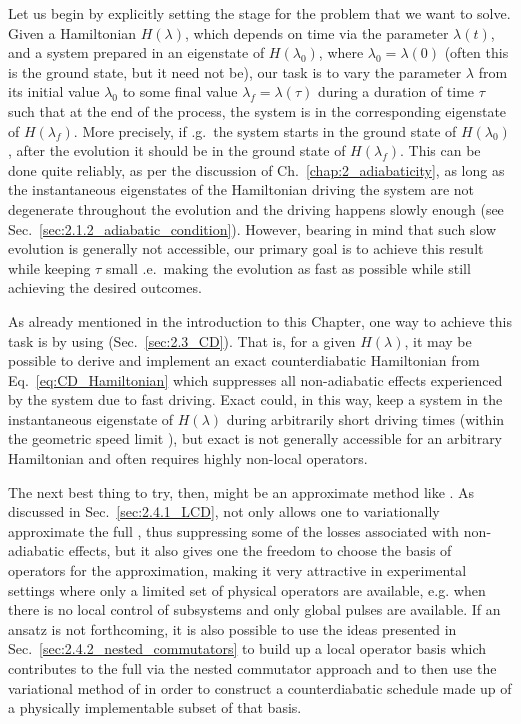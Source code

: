 Let us begin by explicitly setting the stage for the problem that we want to solve. Given a Hamiltonian $H(\lambda)$, which depends on time via the parameter $\lambda(t)$, and a system prepared in an eigenstate of $H(\lambda_0)$, where $\lambda_0 = \lambda(0)$ (often this is the ground state, but it need not be), our task is to vary the parameter $\lambda$ from its initial value $\lambda_0$ to some final value $\lambda_f = \lambda(\tau)$ during a duration of time $\tau$ such that at the end of the process, the system is in the corresponding eigenstate of $H(\lambda_f)$. More precisely, if \@e.g.~the system starts in the ground state of $H(\lambda_0)$, after the evolution it should be in the ground state of $H(\lambda_f)$. This can be done quite reliably, as per the discussion of Ch.~\ref{chap:2_adiabaticity}, as long as the instantaneous eigenstates of the Hamiltonian driving the system are not degenerate throughout the evolution and the driving happens slowly enough (see Sec.~\ref{sec:2.1.2_adiabatic_condition}). However, bearing in mind that such slow evolution is generally not accessible, our primary goal is to achieve this result while keeping $\tau$ small \@i.e.~making the evolution as fast as possible while still achieving the desired outcomes.

As already mentioned in the introduction to this Chapter, one way to achieve this task is by using  (Sec.~\ref{sec:2.3_CD}). That is, for a given $H(\lambda)$, it may be possible to derive and implement an exact counterdiabatic Hamiltonian from Eq.~\eqref{eq:CD_Hamiltonian} which suppresses all non-adiabatic effects experienced by the system due to fast driving. Exact  could, in this way, keep a system in the instantaneous eigenstate of $H(\lambda)$ during arbitrarily short driving times (within the geometric speed limit \cite{bukov_geometric_2019}), but exact  is not generally accessible for an arbitrary Hamiltonian \cite{kolodrubetz_geometry_2017} and often requires highly non-local operators. 

The next best thing to try, then, might be an approximate  method like . As discussed in Sec.~\ref{sec:2.4.1_LCD},  not only allows one to variationally approximate the full , thus suppressing some of the losses associated with non-adiabatic effects, but it also gives one the freedom to choose the basis of operators for the approximation, making it very attractive in experimental settings where only a limited set of physical operators are available, e.g. when there is no local control of subsystems and only global pulses are available. If an ansatz is not forthcoming, it is also possible to use the ideas presented in Sec.~\ref{sec:2.4.2_nested_commutators} to build up a local operator basis which contributes to the full  via the nested commutator approach \cite{geier_floquet_2021} and to then use the variational method of  in order to construct a counterdiabatic schedule made up of a physically implementable subset of that basis. 

